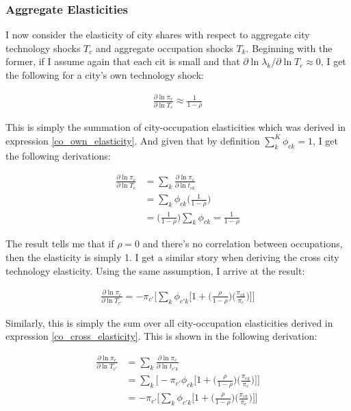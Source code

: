 \documentclass[10pt]{article}
\begin{document}
\subsubsection{Aggregate Elasticities}

I now consider the elasticity of city shares with respect to aggregate city technology shocks $T_c$ and aggregate occupation shocks $T_k$. Beginning with the former, if I assume again that each cit is small and that $\partial \ln \lambda_k / \partial \ln T_c \approx 0$, I get the following for a city's own technology shock:

\begin{align*}
    \frac{\partial \ln \pi_c}{\partial \ln T_c} \approx \frac{1}{1 - \rho}
\end{align*}

This is simply the summation of city-occupation elasticities which was derived in expression \ref{co_own_elasticity}. And given that by definition $\sum \limits_k^K \phi_{ck} = 1$, I get the following derivations:

\begin{align*}
    \frac{\partial{\ln{\pi_{c}}}}{\partial\ln{T_{c}}} & = \sum\limits_{k}\frac{\partial{\ln{\pi_{c}}}}{\partial\ln{t_{ck}}} \\ &= \sum\limits_{k}\phi_{ck}\Bigg(\frac{1}{1-\rho}\Bigg) \\ &= \Bigg(\frac{1}{1-\rho}\Bigg)\sum\limits_{k}\phi_{ck} = \frac{1}{1-\rho}
\end{align*}

The result tells me that if $\rho = 0$ and there's no correlation between occupations, then the elasticity is simply 1. I get a similar story when deriving the cross city technology elasticity. Using the same assumption, I arrive at the result:

\begin{align}
    \frac{\partial\ln{\pi_{c}}}{\partial\ln{T_{c'}}} = -\pi_{c'}\Bigg[\sum\limits_{k}\phi_{{c'}k}\Big[1+\Big(\frac{\rho}{1-\rho}\Big)\Big(\frac{\pi_{ck}}{\pi_{c}}\Big)\Big]\Bigg]
    \label{city_cross_elasticity}
\end{align}

Similarly, this is simply the sum over all city-occupation elasticities derived in expression \ref{co_cross_elasticity}. This is shown in the following derivation:

\begin{align*}
    \frac{\partial\ln{\pi_{c}}}{\partial\ln{T_{c'}}} & = \sum\limits_{k}\frac{\partial\ln{\pi_{c}}}{\partial\ln{t_{{c'}k}}} \\ &= \sum\limits_{k}\Bigg[-{\pi_{c'}}{\phi_{ck}}\Big[1+\Big(\frac{\rho}{1-\rho}\Big)\Big(\frac{\pi_{ck}}{\pi_{c}}\Big)\Big]\Bigg]\\ &= -\pi_{c'}\Bigg[\sum\limits_{k}\phi_{{c'}k}\Big[1+\Big(\frac{\rho}{1-\rho}\Big)\Big(\frac{\pi_{ck}}{\pi_{c}}\Big)\Big]\Bigg]
\end{align*}
\end{document}
